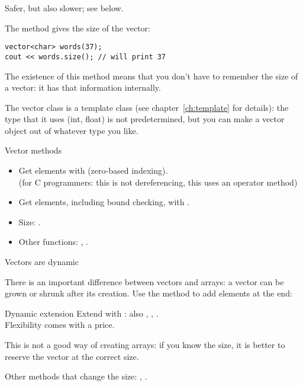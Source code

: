 Safer, but also slower; see below.

The method  gives the size of the vector:
\begin{verbatim}
vector<char> words(37);
cout << words.size(); // will print 37
\end{verbatim}
The existence of this method means that you don't have to remember the
size of a vector: it has that information internally.

\begin{advanced}
  The vector class is a template class (see chapter~\ref{ch:template}
  for details): the type that it uses (int,
  float) is not predetermined, but you can make a vector object out of
  whatever type you like.
\end{advanced}

\begin{slide}{Vector methods}
  \label{sl:vector-method}
  \begin{itemize}
  \item Get elements with  (zero-based indexing).\\
    (for C programmers: this is not dereferencing, this uses an
    operator method)
  \item Get elements, including bound checking, with .
  \item Size: .
  \item Other functions: , .
  \end{itemize}
\end{slide}

 {Vectors are dynamic}
\label{sec:stdvector-dynamic}

There is an important difference between vectors and arrays: a vector
can be grown or shrunk after its creation.
Use the  method to add elements at the end:

\begin{block}{Dynamic extension}
  \label{sl:vector-dynamic}
  Extend with :
  also , , .\\
  Flexibility comes with a price.
\end{block}

This is not a good way of creating arrays: if you know the size, it is
better to reserve the vector at the correct size.

Other methods that change the size: , .

